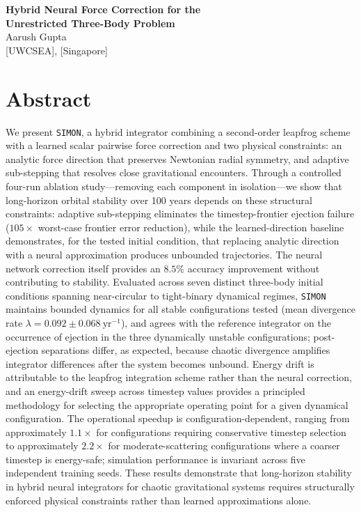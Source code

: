 \documentclass[12pt]{article}
\begin{document}
\newpage
{}
\setcounter{page}{1}
\thispagestyle{plain}

\begin{center}
  {\Large \textbf{Hybrid Neural Force Correction for the\\[0.2cm]
   Unrestricted Three-Body Problem}}\\[0.8cm]
  {\large Aarush Gupta}\\[0.3cm]
  {\small [UWCSEA], [Singapore]}\\[1cm]
\end{center}

\section*{Abstract}

We present \texttt{SIMON}, a hybrid integrator combining a second-order
leapfrog scheme with a learned scalar pairwise force correction and two
physical constraints: an analytic force direction that preserves Newtonian
radial symmetry, and adaptive sub-stepping that resolves close gravitational
encounters. Through a controlled four-run ablation study---removing each
component in isolation---we show that long-horizon orbital stability over
100 years depends on these structural constraints: adaptive sub-stepping
eliminates the timestep-frontier ejection failure ($105\times$ worst-case
frontier error reduction), while the learned-direction baseline demonstrates,
for the tested initial condition, that replacing analytic direction with a
neural approximation produces unbounded trajectories. The neural network
correction itself provides an $8.5\%$ accuracy improvement without
contributing to stability. Evaluated across seven distinct three-body initial
conditions spanning near-circular to tight-binary dynamical regimes,
\texttt{SIMON} maintains bounded dynamics for all stable configurations tested
(mean divergence rate $\lambda = 0.092 \pm 0.068\ \mathrm{yr}^{-1}$), and
agrees with the reference integrator on the occurrence of ejection in the three
dynamically unstable configurations; post-ejection separations differ, as
expected, because chaotic divergence amplifies integrator differences after the
system becomes unbound. Energy drift is attributable to the leapfrog
integration scheme rather than the neural correction, and an energy-drift sweep
across timestep values provides a principled methodology for selecting the
appropriate operating point for a given dynamical configuration. The operational
speedup is configuration-dependent, ranging from approximately $1.1\times$ for
configurations requiring conservative timestep selection to approximately
$2.2\times$ for moderate-scattering configurations where a coarser timestep is
energy-safe; simulation performance is invariant across five independent
training seeds. These results demonstrate that long-horizon stability in hybrid
neural integrators for chaotic gravitational systems requires structurally
enforced physical constraints rather than learned approximations alone.
\end{document}
